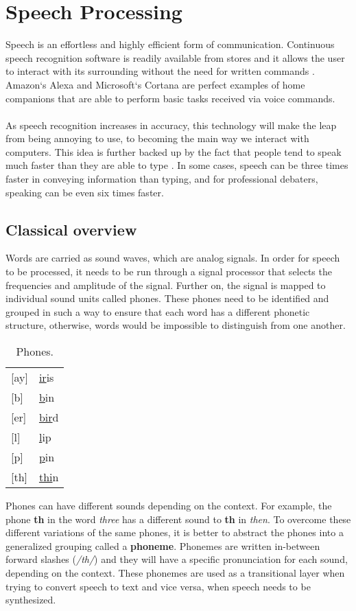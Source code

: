 \chapter{Speech Processing}\label{ch:speech_processing}
Speech is an effortless and highly efficient form of communication.
Continuous speech recognition software is readily available from stores and it allows the user to interact with its surrounding without the need for written commands
\cite[p.~396]{callan2003artificial}. Amazon`s Alexa 
\cite{Alexa} and Microsoft`s Cortana 
\cite{Cortana} are perfect examples of home companions that are able to perform basic tasks received via voice commands.\\\\
As speech recognition increases in accuracy, this technology will make the leap from being annoying to use, to becoming the main way we interact with computers. 
This idea is further backed up by the fact that people tend to speak much faster than they are able to type \cite{Speed}.
In some cases, speech can be three times faster in conveying information than typing, and for professional debaters,
speaking can be even six times faster.

\section{Classical overview}
Words are carried as sound waves, which are analog signals.
In order for speech to be processed,
it needs to be run through a signal processor that selects the frequencies and amplitude of the signal.
Further on, the signal is mapped to individual sound units called phones.
These phones need to be identified and grouped in such a way to ensure that each word has a different phonetic structure,
otherwise, words would be impossible to distinguish from one another.
\begin{table}[H]
\centering
    \caption{Phones.}
    \label{my-label}
    \begin{tabular}{l l}
        {[}ay{]} & \underline{ir}is \\
        {[}b{]}  & \underline{b}in  \\
        {[}er{]} & \underline{bir}d \\
        {[}l{]}  & \underline{l}ip  \\
        {[}p{]}  & \underline{p}in  \\
        {[}th{]} & \underline{thi}n
    \end{tabular}
\end{table}
Phones can have different sounds depending on the context. 
For example, the phone \textbf{th} in the word \textit{three} has a different sound to \textbf{th} in \textit{then}. 
To overcome these different variations of the same phones, 
it is better to abstract the phones into a generalized grouping called a \textbf{phoneme}.
Phonemes are written in-between forward slashes
(\textit{/th/}) and they will have a specific pronunciation for each sound, depending on the context.
These phonemes are used as a transitional layer when trying to convert speech to text and vice versa,
when speech needs to be synthesized.


